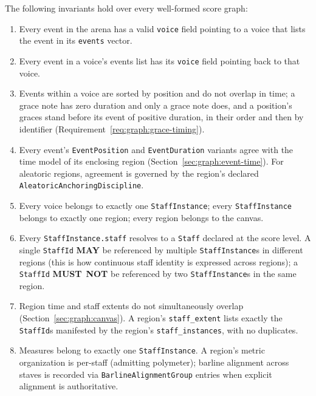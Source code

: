 \documentclass[11pt,letterpaper]{report}
\newcounter{requirement}[chapter]
\newcommand{\MUSTNOT}{\textbf{MUST}\nobreak\ \textbf{NOT}}
\newcommand{\MAY}{\textbf{MAY}}
\begin{document}
\begin{requirement}
  \label{req:graph:score-graph-invariants}
  The following invariants hold over every well-formed score graph:

  \begin{enumerate}
    \item Every event in the arena has a valid \texttt{voice} field
      pointing to a voice that lists the event in its \texttt{events}
      vector.
    \item Every event in a voice's events list has its \texttt{voice}
      field pointing back to that voice.
    \item Events within a voice are sorted by position and do not
      overlap in time; a grace note has zero duration and only a grace
      note does, and a position's graces stand before its event of
      positive duration, in their order and then by identifier
      (Requirement~\ref{req:graph:grace-timing}).
    \item Every event's \texttt{EventPosition} and
      \texttt{EventDuration} variants agree with the time model of
      its enclosing region (Section~\ref{sec:graph:event-time}). For
      aleatoric regions, agreement is governed by the region's
      declared \texttt{AleatoricAnchoringDiscipline}.
    \item Every voice belongs to exactly one \texttt{StaffInstance};
      every \texttt{StaffInstance} belongs to exactly one region;
      every region belongs to the canvas.
    \item Every \texttt{StaffInstance.staff} resolves to a
      \texttt{Staff} declared at the score level. A single
      \texttt{StaffId} \MAY{} be referenced by multiple
      \texttt{StaffInstance}s in different regions (this is how
      continuous staff identity is expressed across regions); a
      \texttt{StaffId} \MUSTNOT{} be referenced by two
      \texttt{StaffInstance}s in the same region.
    \item Region time and staff extents do not simultaneously overlap
      (Section~\ref{sec:graph:canvas}). A region's
      \texttt{staff\_extent} lists exactly the \texttt{StaffId}s
      manifested by the region's \texttt{staff\_instances}, with no
      duplicates.
    \item Measures belong to exactly one \texttt{StaffInstance}. A
      region's metric organization is per-staff (admitting
      polymeter); barline alignment across staves is recorded via
      \texttt{BarlineAlignmentGroup} entries when explicit alignment
      is authoritative.

\end{enumerate}
\end{requirement}
\end{document}
